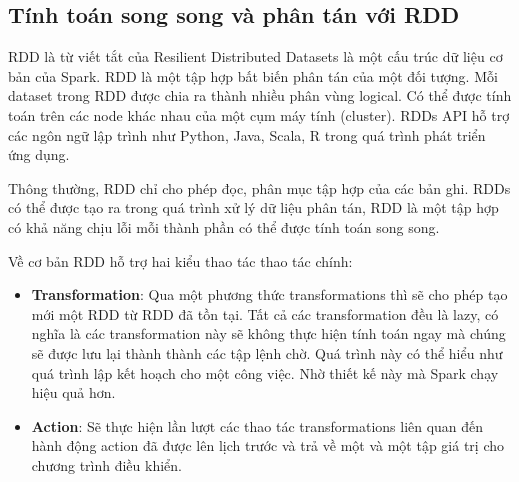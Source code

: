 \subsection{Tính toán song song và phân tán với RDD}
RDD là từ viết tắt của Resilient Distributed Datasets là một cấu trúc dữ liệu cơ bản của Spark. RDD là một tập hợp bất biến phân tán của một đối tượng. Mỗi dataset trong RDD được chia ra thành nhiều phân vùng logical. Có thể được tính toán trên các node khác nhau của một cụm máy tính (cluster). RDDs API hỗ trợ các ngôn ngữ lập trình như Python, Java, Scala, R trong quá trình phát triển ứng dụng. 

Thông thường, RDD chỉ cho phép đọc, phân mục tập hợp của các bản ghi. RDDs có thể được tạo ra trong quá trình xử lý dữ liệu phân tán, RDD là một tập hợp có khả năng chịu lỗi mỗi thành phần có thể được tính toán song song.

Về cơ bản RDD hỗ trợ hai kiểu thao tác thao tác chính:
\begin{itemize}
	\item \textbf{Transformation}: Qua một phương thức transformations thì sẽ cho phép tạo mới một RDD từ RDD đã tồn tại.	Tất cả các transformation đều là lazy, có nghĩa là các transformation này sẽ không thực hiện tính toán ngay mà chúng sẽ được lưu lại thành thành các tập lệnh chờ. Quá trình này có thể hiểu như quá trình lập kết hoạch cho một công việc. Nhờ thiết kế này mà Spark chạy hiệu quả hơn.
	\item \textbf{Action}: Sẽ thực hiện lần lượt các thao tác transformations liên quan đến hành động action đã được lên lịch trước và trả về một và một tập giá trị cho chương trình điều khiển.
\end{itemize}

